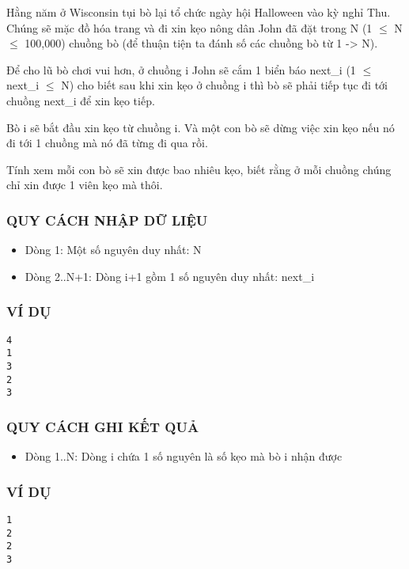 



   Hằng năm ở Wisconsin tụi bò lại tổ chức ngày hội Halloween vào kỳ nghỉ Thu. Chúng sẽ mặc đồ hóa trang và đi xin kẹo nông dân John đã đặt trong  N (1  $\le$  N  $\le$  100,000) chuồng bò (để thuận tiện ta đánh số các chuồng  bò từ 1 -> N).  

   Để cho lũ bò chơi vui hơn, ở chuồng i John sẽ cắm 1 biển báo next\_i  (1  $\le$  next\_i  $\le$  N) cho biết sau khi xin kẹo ở chuồng i thì bò sẽ phải  tiếp tục đi tới chuồng next\_i để xin kẹo tiếp.  

   Bò i sẽ bắt đầu xin kẹo từ chuồng i. Và một con bò sẽ dừng việc xin kẹo nếu nó đi tới 1 chuồng mà nó đã từng đi qua rồi.  

   Tính xem mỗi con bò sẽ xin được bao nhiêu kẹo, biết rằng ở mỗi chuồng chúng chỉ xin được 1 viên kẹo mà thôi.  

\subsubsection{   QUY CÁCH NHẬP DỮ LIỆU  }
\begin{itemize}
	\item     Dòng 1: Một số nguyên duy nhất: N   
	\item     Dòng 2..N+1: Dòng i+1 gồm 1 số nguyên duy nhất: next\_i   
\end{itemize}

\subsubsection{   VÍ DỤ  }
\begin{verbatim}
4
1
3
2
3
\end{verbatim}

\subsubsection{   QUY CÁCH GHI KẾT QUẢ  }
\begin{itemize}
	\item     Dòng 1..N: Dòng i chứa 1 số nguyên là số kẹo mà bò i nhận được   
\end{itemize}

\subsubsection{   VÍ DỤ  }
\begin{verbatim}
1
2
2
3
\end{verbatim}
